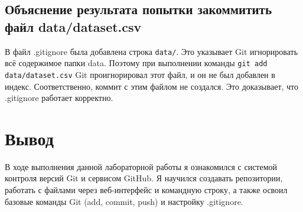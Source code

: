 \documentclass[a4paper,12pt]{article}
\begin{document}
\subsection{Объяснение результата попытки закоммитить файл data/dataset.csv}
В файл .gitignore была добавлена строка \texttt{data/}. Это указывает Git игнорировать всё содержимое папки data. Поэтому при выполнении команды \texttt{git add data/dataset.csv} Git проигнорировал этот файл, и он не был добавлен в индекс. Соответственно, коммит с этим файлом не создался. Это доказывает, что .gitignore работает корректно.
\section{Вывод}
В ходе выполнения данной лабораторной работы я ознакомился с системой контроля версий Git и сервисом GitHub. Я научился создавать репозитории, работать с файлами через веб-интерфейс и командную строку, а также освоил базовые команды Git (add, commit, push) и настройку .gitignore.
\end{document}
